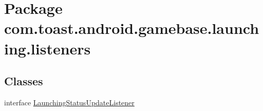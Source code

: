 \hypertarget{namespacecom_1_1toast_1_1android_1_1gamebase_1_1launching_1_1listeners}{}\section{Package com.\+toast.\+android.\+gamebase.\+launching.\+listeners}
\label{namespacecom_1_1toast_1_1android_1_1gamebase_1_1launching_1_1listeners}
\subsection*{Classes}
\begin{DoxyCompactItemize}
\item 
interface \hyperlink{interfacecom_1_1toast_1_1android_1_1gamebase_1_1launching_1_1listeners_1_1_launching_status_update_listener}{Launching\+Status\+Update\+Listener}
\end{DoxyCompactItemize}
